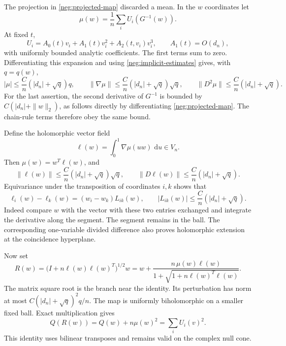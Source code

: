 \documentclass[11pt]{article}
\numberwithin{equation}{section}
\theoremstyle{definition}
\newcommand{\dd}{\,\mathrm d}
\begin{document}
The projection in \eqref{neg:projected-map} discarded a mean.
In the \(w\) coordinates let
\[
 \mu(w)=\frac1n\sum_i U_i(G^{-1}(w)).
 \]
At fixed \(t\),
\[
 U_i=A_0(t)v_i+A_1(t)v_i^2+A_2(t,v_i)v_i^3,
 \qquad A_1(t)=O(d_n),
 \]
with uniformly bounded analytic coefficients.  The first terms
sum to zero.  Differentiating this expansion and using
\eqref{neg:implicit-estimates} gives, with \(q=q(w)\),
\begin{equation}
 |\mu|\le\frac Cn(|d_n|+\sqrt q)q,\qquad
 \|\nabla\mu\|\le\frac Cn(|d_n|+\sqrt q)\sqrt q,\qquad
 \|D^2\mu\|\le\frac Cn(|d_n|+\sqrt q).
 \label{neg:mean-estimates}
\end{equation}
For the last assertion, the second derivative of \(G^{-1}\)
is bounded by \(C(|d_n|+\|w\|_2)\), as follows directly by
differentiating \eqref{neg:projected-map}.  The chain-rule
terms therefore obey the same bound.

Define the holomorphic vector field
\begin{equation}
 \ell(w)=\int_0^1\nabla\mu(u w)\,\dd u\in V_n.
 \label{neg:ell}
\end{equation}
Then \(\mu(w)=w^T\ell(w)\), and
\[
 \|\ell(w)\|\le\frac Cn(|d_n|+\sqrt q)\sqrt q,\qquad
 \|D\ell(w)\|\le\frac Cn(|d_n|+\sqrt q).
 \]
Equivariance under the transposition of coordinates \(i,k\)
shows that
\begin{equation}
 \ell_i(w)-\ell_k(w)=(w_i-w_k)L_{ik}(w),\qquad
 |L_{ik}(w)|\le\frac Cn(|d_n|+\sqrt q).
 \label{neg:ell-pairs}
\end{equation}
Indeed compare \(w\) with the vector with these two entries
exchanged and integrate the derivative along the segment.
The segment remains in the ball.  The corresponding
one-variable divided difference also proves holomorphic
extension at the coincidence hyperplane.

Now set
\begin{equation}
 R(w)=\bigl(I+n\ell(w)\ell(w)^T\bigr)^{1/2}w
     =w+\frac{n\,\mu(w)\ell(w)}
                   {1+\sqrt{1+n\ell(w)^T\ell(w)}}.
 \label{neg:rank-one}
\end{equation}
The matrix square root is the branch near the identity.
Its perturbation has norm at most
\(C(|d_n|+\sqrt q)^2q/n\).  The map is uniformly
biholomorphic on a smaller fixed ball.  Exact multiplication
gives
\begin{equation}
 Q(R(w))=Q(w)+n\mu(w)^2=\sum_i U_i(v)^2 .
 \label{neg:rank-energy}
\end{equation}
This identity uses bilinear transposes and remains valid on
the complex null cone.
\end{document}
